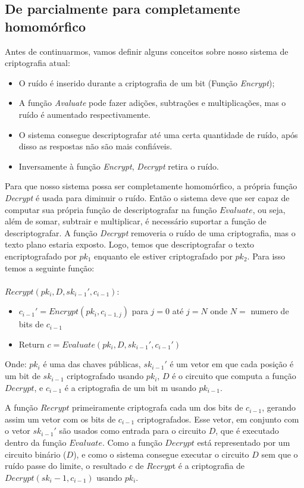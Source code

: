 	\subsection{De parcialmente para completamente homomórfico}
	Antes de continuarmos, vamos definir alguns conceitos sobre nosso sistema de criptografia atual:
	\begin{itemize}
		\item O ruído é inserido durante a criptografia de um bit (Função \textit{Encrypt});
		\item A função \textit{Avaluate} pode fazer adições, subtrações e multiplicações, mas o ruído é aumentado respectivamente.
		\item O sistema consegue descriptografar até uma certa quantidade de ruído, após disso as respostas não são mais confiáveis.
		\item Inversamente à função \textit{Encrypt}, \textit{Decrypt} retira o ruído.
	\end{itemize}
  
	Para que nosso sistema possa ser completamente homomórfico, a própria função \textit{Decrypt} é usada para diminuir o ruído.
	Então o sistema deve que ser capaz de computar sua própria função de descriptografar na função $Evaluate$, ou seja, além de somar, subtrair e multiplicar, é necessário suportar a função de descriptografar.
	A função \textit{Decrypt} removeria o ruído de uma criptografia, mas o texto plano estaria exposto. Logo, temos que descriptografar o texto encriptografado por $pk_1$ enquanto ele estiver criptografado por $pk_2$. Para isso temos a seguinte função:
  \\\\
	$Recrypt(pk_i , D, sk_{i-1}', c_{i-1})$:
	\begin{itemize}
		\item $c_{i-1}' = Encrypt(pk_i, c_{i-1,j})$ para $j = 0$ até $j = N$ onde $N =$ numero de bits de $c_{i-1}$
		\item Return $c = Evaluate(pk_i, D, sk_{i-1}', c_{i-1}')$
	\end{itemize}
	Onde: $pk_i$ é uma das chaves públicas, $sk_{i-1}'$ é um vetor em que cada posição é um bit de $sk_{i-1}$ criptografado usando $pk_i$, $D$ é o circuito que computa a função $Decrypt$, e $c_{i-1}$ é a criptografia de um bit m usando $pk_{i-1}$.
  
	A função $Recrypt$ primeiramente criptografa cada um dos bits de $c_{i-1}$, gerando assim um vetor com os bits de $c_{i-1}$ criptografados.
	Esse vetor, em conjunto com o vetor $sk_{i-1}'$ são usados como entrada para o circuito $D$, que é executado dentro da função $Evaluate$.
	Como a função $Decrypt$ está representado por um circuito binário ($D$), e como o sistema consegue executar o circuito $D$ sem que o ruído passe do limite, o resultado $c$ de $Recryp$t é a criptografia de $Decrypt(sk_i-1, c_{i-1})$ usando $pk_i$.
  
